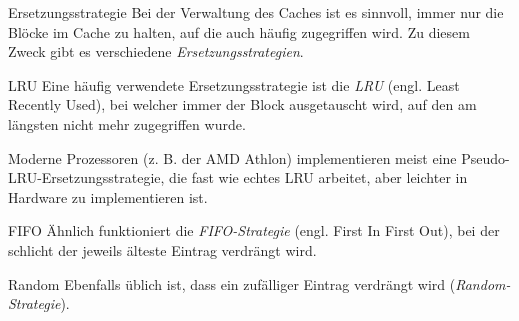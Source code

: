 \begin{defi}{Ersetzungsstrategie}
    Bei der Verwaltung des Caches ist es sinnvoll, immer nur die Blöcke im Cache zu halten, auf die auch häufig zugegriffen wird.
    Zu diesem Zweck gibt es verschiedene \emph{Ersetzungsstrategien}.
\end{defi}

\begin{defi}[Ersetzungsstrategie]{LRU}
    Eine häufig verwendete Ersetzungsstrategie ist die \emph{LRU} (engl. Least Recently Used), bei welcher immer der Block ausgetauscht wird, auf den am längsten nicht mehr zugegriffen wurde.

    Moderne Prozessoren (z. B. der AMD Athlon) implementieren meist eine Pseudo-LRU-Ersetzungsstrategie, die fast wie echtes LRU arbeitet, aber leichter in Hardware zu implementieren ist.
\end{defi}

\begin{defi}[Ersetzungsstrategie]{FIFO}
    Ähnlich funktioniert die \emph{FIFO-Strategie} (engl. First In First Out), bei der schlicht der jeweils älteste Eintrag verdrängt wird.
\end{defi}

\begin{defi}[Ersetzungsstrategie]{Random}
    Ebenfalls üblich ist, dass ein zufälliger Eintrag verdrängt wird (\emph{Random-Strategie}).
\end{defi}

